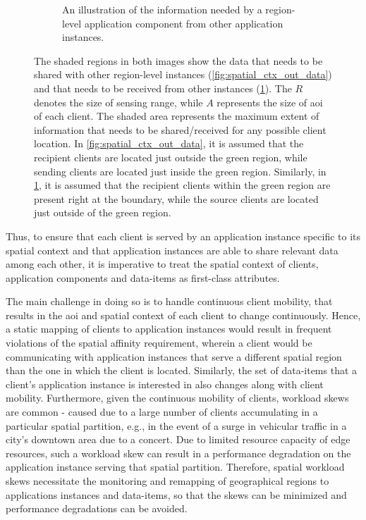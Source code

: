 \begin{figure}
\begin{subfigure}{0.4\textwidth}
  \caption{An illustration of the information needed by a region-level application component from other application instances. }
  \label{fig:spatial_ctx_in_data}
\end{subfigure}
\caption{The shaded regions in both images show the data that needs to be shared with other region-level instances (\cref{fig:spatial_ctx_out_data}) and that needs to be received from other instances (\cref{fig:spatial_ctx_in_data}). The $R$ denotes the size of sensing range, while $A$ represents the size of \gls{aoi} of each client. The shaded area represents the maximum extent of information that needs to be shared/received for any possible client location. In \cref{fig:spatial_ctx_out_data}, it is assumed that the recipient clients are located just outside the green region, while sending clients are located just inside the green region. Similarly, in \cref{fig:spatial_ctx_in_data}, it is assumed that the recipient clients within the green region are present right at the boundary, while the source clients are located just outside of the green region.}
\label{fig:spatial_data_sharing}
\end{figure}
Thus, to ensure that each client is served by an application instance specific to its spatial context and that application instances are able to share relevant data among each other, it is imperative to treat the spatial context of clients, application components and data-items as first-class attributes. 
\par The main challenge in doing so is to handle continuous client mobility, that results in the \gls{aoi} and spatial context of each client to change continuously. Hence, a static mapping of clients to application instances would result in frequent violations of the spatial affinity requirement, wherein a client would be communicating with application instances that serve a different spatial region than the one in which the client is located. Similarly, the set of data-items that a client's application instance is interested in also changes along with client mobility. Furthermore, given the continuous mobility of clients, workload skews are common - caused due to a large number of clients accumulating in a particular spatial partition, e.g., in the event of a surge in vehicular traffic in a city's downtown area due to a concert. Due to limited resource capacity of edge resources, such a workload skew can result in a performance degradation on the application instance serving that spatial partition. Therefore, spatial workload skews necessitate the monitoring and remapping of geographical regions to applications instances and data-items, so that the skews can be minimized and performance degradations can be avoided.

